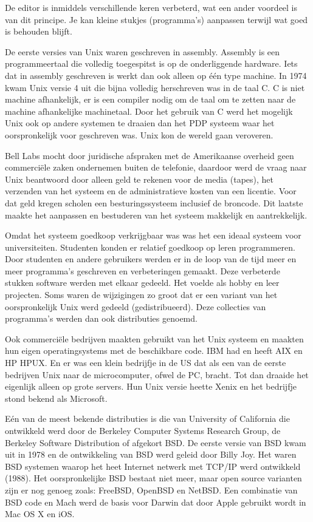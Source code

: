 De editor is inmiddels verschillende keren verbeterd, wat een ander voordeel is van dit  principe. Je kan kleine stukjes (programma's) aanpassen terwijl wat goed is behouden blijft.

De eerste versies van Unix waren geschreven in assembly. Assembly is een programmeertaal die volledig toegespitst is op de onderliggende hardware. Iets dat in assembly geschreven is werkt dan ook alleen op \'e\'en type machine. In 1974 kwam Unix versie 4 uit die bijna volledig herschreven was in de
taal C. C is niet machine afhankelijk, er is een compiler nodig om de taal om te zetten naar de machine afhankelijke machinetaal. Door het gebruik van C werd het mogelijk Unix ook op andere systemen te draaien dan het PDP systeem
waar het oorspronkelijk voor geschreven was. Unix kon de wereld gaan veroveren.\par

Bell Labs mocht door juridische afspraken met de Amerikaanse overheid geen commerci\"ele zaken ondernemen buiten de telefonie, daardoor werd de vraag naar Unix beantwoord door alleen geld te rekenen voor de media (tapes), het verzenden van het systeem en de administratieve kosten van een licentie. Voor dat geld kregen scholen een besturingssysteem inclusief de broncode. Dit laatste maakte het aanpassen en bestuderen van het systeem makkelijk en aantrekkelijk.

Omdat het systeem goedkoop verkrijgbaar was was het een ideaal systeem voor universiteiten. Studenten konden er relatief goedkoop op leren programmeren. Door studenten en andere
gebruikers werden er in de loop van de tijd meer en meer programma's geschreven en verbeteringen gemaakt. Deze verbeterde stukken software werden met elkaar gedeeld. Het voelde als hobby en leer projecten. Soms waren de wijzigingen zo groot dat er een variant van het oorspronkelijk Unix werd gedeeld (gedistribueerd). Deze collecties van programma's werden dan ook distributies genoemd.

Ook commerci\"ele bedrijven maakten gebruikt van het Unix systeem en maakten hun eigen operatingsystems met de beschikbare code. IBM had en heeft AIX en HP HPUX. En er was een klein bedrijfje in de US dat als een van de eerste bedrijven Unix naar de microcomputer, ofwel de PC, bracht. Tot dan draaide het eigenlijk alleen op grote servers. Hun Unix versie heette Xenix en het bedrijfje stond bekend als Microsoft.

E\'en van de meest bekende distributies is die van University of California die ontwikkeld werd door de Berkeley Computer Systems Research Group, de Berkeley Software Distribution of afgekort BSD. De eerste versie van BSD kwam uit in 1978 en de ontwikkeling van BSD werd geleid door Billy Joy. Het waren BSD systemen waarop het heet Internet netwerk met TCP/IP werd ontwikkeld (1988). Het oorspronkelijke BSD bestaat niet meer, maar open source varianten zijn er nog genoeg zoals: FreeBSD, OpenBSD en NetBSD. Een combinatie van BSD code en Mach werd de basis voor Darwin dat door Apple gebruikt wordt in Mac OS X en iOS.

